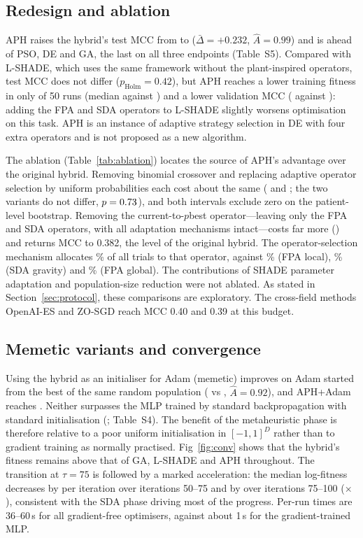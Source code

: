 \documentclass[preprint,12pt]{elsarticle}
\begin{document}
\subsection{Redesign and ablation}\label{sec:redesign}
APH raises the hybrid's test MCC from \MCCHybrid{} to \MCCAph{} ($\bar\Delta=+0.232$, $\hat A=0.99$) and is ahead of PSO, DE and GA, the last on all three endpoints (Table~S5). Compared with L-SHADE, which uses the same framework without the plant-inspired operators, test MCC does not differ ($p_{\mathrm{Holm}}=0.42$), but APH reaches a lower training fitness in only \WinFitAphlShade{} of 50 runs (median \FitAph{} against \FitLshade) and a lower validation MCC (\ValAph{} against \ValLshade): adding the FPA and SDA operators to L-SHADE slightly worsens optimisation on this task. APH is an instance of adaptive strategy selection in DE \citep{qin2009sade,gong2011strategy} with four extra operators and is not proposed as a new algorithm.

The ablation (Table~\ref{tab:ablation}) locates the source of APH's advantage over the original hybrid. Removing binomial crossover and replacing adaptive operator selection by uniform probabilities each cost about the same (\AblNoCx{} and \AblUniform; the two variants do not differ, $p=0.73$), and both intervals exclude zero on the patient-level bootstrap. Removing the current-to-$p$best operator---leaving only the FPA and SDA operators, with all adaptation mechanisms intact---costs far more (\AblPlant) and returns MCC to 0.382, the level of the original hybrid. The operator-selection mechanism allocates \ShareAnimal\% of all trials to that operator, against \ShareLocal\% (FPA local), \ShareGravity\% (SDA gravity) and \ShareGlobal\% (FPA global). The contributions of SHADE parameter adaptation and population-size reduction were not ablated. As stated in Section~\ref{sec:protocol}, these comparisons are exploratory. The cross-field methods OpenAI-ES and ZO-SGD reach MCC 0.40 and 0.39 at this budget.



\subsection{Memetic variants and convergence}
Using the hybrid as an initialiser for Adam (memetic) improves on Adam started from the best of the same random population (\MCCMemeticHybrid{} vs \MCCAdamOnly, $\hat A=0.92$), and APH+Adam reaches \MCCMemeticAph. Neither surpasses the MLP trained by standard backpropagation with standard initialisation (\MCCMlpAdam; Table~S4). The benefit of the metaheuristic phase is therefore relative to a poor uniform initialisation in $[-1,1]^D$ rather than to gradient training as normally practised. Fig~\ref{fig:conv} shows that the hybrid's fitness remains above that of GA, L-SHADE and APH throughout. The transition at $\tau=75$ is followed by a marked acceleration: the median log-fitness decreases by \SlopePre{} per iteration over iterations 50--75 and by \SlopePost{} over iterations 75--100 (\SlopeRatio$\times$), consistent with the SDA phase driving most of the progress. Per-run times are 36--60\,s for all gradient-free optimisers, against about 1\,s for the gradient-trained MLP.
\end{document}
